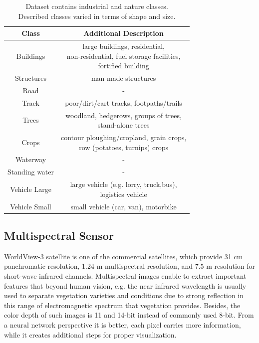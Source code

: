 \documentclass[10pt,twocolumn,letterpaper]{article}
\begin{document}
\begin{table}[h!]
	\begin{center}
		\captionsetup{justification=centering}
		\begin{tabular}{|c|c|}
			\hline
			\textbf{Class}    & \textbf{Additional Description} \\ \hline 
			Buildings      &  \makecell{large buildings, residential, \\ non-residential, fuel storage facilities, \\ fortified building} \\ \hline
			Structures     &  man-made structures	  \\ \hline
			Road           &  	 -  \\ \hline
			Track          & poor/dirt/cart tracks, footpaths/trails	  \\ \hline
			Trees 	       &   \makecell{woodland, hedgerows, groups of trees, \\ stand-alone trees}	  \\ \hline
			Crops 	       &  \makecell{contour ploughing/cropland, grain crops, \\ row (potatoes, turnips) crops}   \\ \hline
			Waterway       &   -   \\ \hline
			Standing water &   -   \\ \hline
			Vehicle Large  & \makecell{large vehicle (e.g. lorry, truck,bus), \\ logistics vehicle}      \\ \hline
			Vehicle Small  &  small vehicle (car, van), motorbike    \\ \hline
		\end{tabular}
		\caption{Dataset contains  industrial and nature classes. \\ Described classes varied in terms of shape and size.}\label{tab:classes}
	\end{center}	
\end{table}


\subsection{Multispectral Sensor}
\label{section:sensor}

WorldView-3 satellite is one of the commercial satellites, which provide 31 cm panchromatic resolution, 1.24 m multispectral resolution, and 7.5 m resolution for short-wave infrared channels. Multispectral images enable to extract important features that beyond human vision, e.g. the near infrared wavelength is usually used to separate vegetation varieties and conditions due to strong reflection in this range of electromagnetic spectrum that vegetation provides. Besides, the color depth of such images is 11 and 14-bit instead of commonly used 8-bit. From a neural network perspective it is better, each pixel carries more information, while it creates additional steps for proper visualization.
\end{document}
